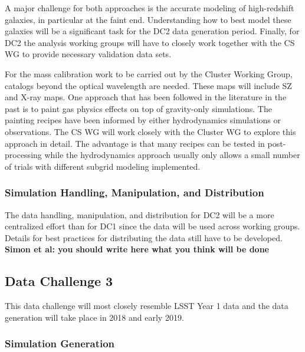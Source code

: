 A major challenge for both approaches is the accurate modeling of high-redshift galaxies, in particular at the faint end. Understanding how to best model these galaxies will be a significant task for the DC2 data generation period. 
Finally, for DC2 the analysis working groups will have to closely work together with the CS WG to provide necessary validation data sets.

For the mass calibration work to be carried out by the Cluster Working Group, catalogs beyond the optical wavelength are needed. These maps will include SZ and X-ray maps. One approach that has been followed in the literature in the past is to paint gas physics effects on top of gravity-only simulations. The painting recipes have been informed by either hydrodynamics simulations or observations. The CS WG will work closely with the Cluster WG to explore this approach in detail. The advantage is that many recipes can be tested in post-processing while the hydrodynamics approach usually only allows a small number of trials with different subgrid modeling implemented.


\subsubsection{Simulation Handling, Manipulation, and Distribution}
\label{sec:keysims:dc2:handling}

The data handling, manipulation, and distribution for DC2 will be a more centralized effort than for DC1 since the data will be used across working groups. Details for best practices for distributing the data still have to be developed. {\bf Simon et al: you should write here what you think will be done}

\subsection{Data Challenge 3}
\label{sec:keysims:dc3}

This data challenge will most closely resemble LSST Year 1 data and the data generation will take place in 2018 and early 2019.

\subsubsection{Simulation Generation}
\label{sec:keysims:dc3:simgen}

